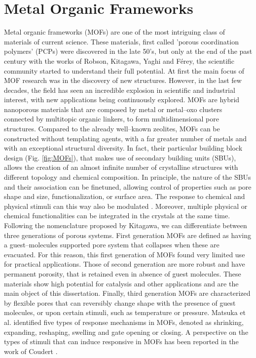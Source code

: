 \section{Metal Organic Frameworks}
Metal organic frameworks (MOFs) are one of the most intriguing class of materials of current science. These materials, first called 'porous coordination polymers' (PCPs) were discovered in the late 50's, but only at the end of the past century with the works of Robson\cite{batten1995two,hoskins1990design}, Kitagawa\cite{kitagawa1991synthesis, kitagawa1993synthesis}, Yaghi\cite{yaghi1995hydrothermal} and F\'{e}rey\cite{riou1998hybrid}, the scientific community started to understand their full potential. At first the main focus of MOF research was in the discovery of new structures. However, in the last few decades, the field has seen an incredible explosion in scientific and industrial interest, with new applications being continuously explored\cite{furukawa2013chemistry}. MOFs are hybrid nanoporous materials that are composed by metal or metal--oxo clusters connected by multitopic organic linkers, to form multidimensional pore structures. Compared to the already well--known zeolites, MOFs can be constructed without templating agents, with a far greater number of metals and with an exceptional structural diversity. In fact, their particular building block design (Fig. \ref{fig:MOFs}), that makes use of secondary building units (SBUs), allows the creation of an almost infinite number of crystalline structures with different topology and chemical composition. In principle, the nature of the SBUs and their association can be finetuned\cite{stock2011synthesis}, allowing control of properties such as pore shape and size, functionalization, or surface area. The response to chemical and physical stimuli can this way also be modulated \cite{zhou2014metal,zhou2012introduction}. Moreover, multiple physical or chemical functionalities can be integrated in the crystals at the same time\cite{li2016applications}. 
\npar
Following the nomenclature proposed by Kitagawa, we can differentiate between three generations of porous systems\cite{kitagawa1998functional}. First generation MOFs are defined as having a guest--molecules supported pore system that collapses when these are evacuated. For this reason, this first generation of MOFs found very limited use for practical applications. Those of second generation are more robust and have permanent porosity, that is retained even in absence of guest molecules. These materials show high potential for catalysis and other applications and are the main object of this dissertation. Finally, third generation MOFs are characterized by flexible pores that can reversibly change shape with the presence of guest molecules, or upon certain stimuli, such as temperature or pressure. Matsuka et al.\cite{matsuda2004guest} identified five types of response mechanisms in MOFs, denoted as shrinking, expanding, reshaping, swelling and gate opening or closing. A perspective on the types of stimuli that can induce responsive in MOFs has been reported in the work of Coudert \cite{coudert2015responsive}.
